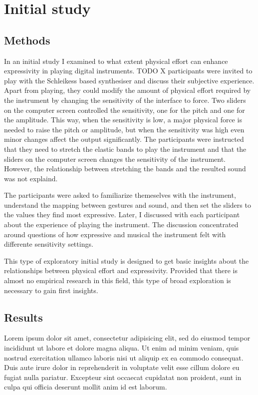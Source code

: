 \documentclass{sigchi}
\begin{document}
\section{Initial study}

\subsection{Methods}

In an initial study I examined to what extent physical effort can enhance expressivity in playing digital instruments.
TODO X participants were invited to play with the Schleikess based synthesiser and discuss their subjective experience.
Apart from playing, they could modify the amount of physical effort required by the instrument by changing the sensitivity of the interface to force.
Two sliders on the computer screen controlled the sensitivity, one for the pitch and one for the amplitude.
This way, when the sensitivity is low, a major physical force is needed to raise the pitch or amplitude, but when the sensitivity was high even minor changes affect the output significantly.
The participants were instructed that they need to stretch the elastic bands to play the instrument and that the sliders on the computer screen changes the sensitivity of the instrument.
However, the relationship between stretching the bands and the resulted sound was not explaind.

The participants were asked to familiarize themeselves with the instrument, understand the mapping between gestures and sound, and then set the sliders to the values they find most expressive.
Later, I discussed with each participant about the experience of playing the instrument.
The discussion concentrated around questions of how expressive and musical the instrument felt with differente sensitivity settings.

This type of exploratory initial study is designed to get basic insights about the relationships between physical effort and expressivity.
Provided that there is almost no empirical research in this field, this type of broad exploration is necessary to gain first insights.

\subsection{Results}

Lorem ipsum dolor sit amet, consectetur adipisicing elit, sed do eiusmod tempor incididunt ut labore et dolore magna aliqua. Ut enim ad minim veniam, quis nostrud exercitation ullamco laboris nisi ut aliquip ex ea commodo consequat. Duis aute irure dolor in reprehenderit in voluptate velit esse cillum dolore eu fugiat nulla pariatur. Excepteur sint occaecat cupidatat non proident, sunt in culpa qui officia deserunt mollit anim id est laborum.
\end{document}
